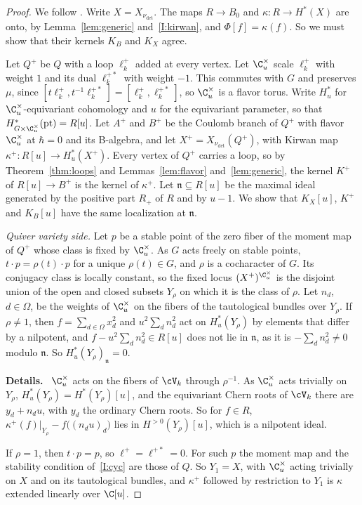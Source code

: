 \documentclass[11pt]{amsart}
\newenvironment{details}{\par\color{black!60!green}\noindent\textbf{Details.}\ }{\par}
\begin{document}
\begin{proof}
We follow .  Write $X=X_{\nu_{\det}}$.  The maps $R\to B_0$
and $\kappa\colon R\to H^*(X)$ are onto, by Lemma~\ref{lem:generic}
and~\ref{I:kirwan}, and $\Phi[f]=\kappa(f)$.  So we must show that their
kernels $K_B$ and $K_X$ agree.

Let $Q^+$ be $Q$ with a loop $\ell_k^+$ added at every vertex.  Let
$\C^\times_u$ scale $\ell_k^+$ with weight $1$ and its dual $\ell_k^{+*}$ with
weight $-1$.  This commutes with $G$ and preserves $\mu$, since
$[t\ell_k^+,t^{-1}\ell_k^{+*}]=[\ell_k^+,\ell_k^{+*}]$, so $\C^\times_u$ is a
flavor torus.  Write $H^*_u$ for $\C^\times_u$-equivariant cohomology and $u$ for
the equivariant parameter, so that $H^*_{G\times\C^\times_u}(\mathrm{pt})=R[u]$.
Let $A^+$ and $B^+$ be the Coulomb branch of $Q^+$ with flavor $\C^\times_u$
at $\hbar=0$ and its B-algebra, and let $X^+=X_{\nu_{\det}}(Q^+)$, with Kirwan
map $\kappa^+\colon R[u]\to H^*_u(X^+)$.  Every vertex of $Q^+$ carries a loop,
so by Theorem~\ref{thm:loops} and Lemmas~\ref{lem:flavor}
and~\ref{lem:generic}, the kernel $K^+$ of $R[u]\to B^+$ is the kernel of
$\kappa^+$.  Let $\mathfrak n\subseteq R[u]$ be the maximal ideal generated by
the positive part $R_+$ of $R$ and by $u-1$.  We show that $K_X[u]$, $K^+$ and
$K_B[u]$ have the same localization at $\mathfrak n$.

\emph{Quiver variety side.}  Let $p$ be a stable point of the zero fiber of
the moment map of $Q^+$ whose class is fixed by $\C^\times_u$.  As $G$ acts
freely on stable points, $t\cdot p=\rho(t)\cdot p$ for a unique $\rho(t)\in G$,
and $\rho$ is a cocharacter of $G$.  Its conjugacy class is locally constant,
so the fixed locus $(X^+)^{\C^\times_u}$ is the disjoint union of the open and
closed subsets $Y_\rho$ on which it is the class of $\rho$.  Let $n_d$,
$d\in\Omega$, be the weights of $\C^\times_u$ on the fibers of the tautological
bundles over $Y_\rho$.  If $\rho\neq1$, then $f=\sum_{d\in\Omega}x_d^2$ and
$u^2\sum_dn_d^2$ act on $H^*_u(Y_\rho)$ by elements that differ by a nilpotent,
and $f-u^2\sum_dn_d^2\in R[u]$ does not lie in $\mathfrak n$, as it is
$-\sum_dn_d^2\neq0$ modulo $\mathfrak n$.  So $H^*_u(Y_\rho)_{\mathfrak n}=0$.
\begin{details}
$\C^\times_u$ acts on the fibers of $\cV_k$ through $\rho^{-1}$.  As
$\C^\times_u$ acts trivially on $Y_\rho$,
$H^*_u(Y_\rho)=H^*(Y_\rho)[u]$, and the equivariant Chern roots of $\cV_k$ there
are $y_d+n_du$, with $y_d$ the ordinary Chern roots.  So for $f\in R$,
$\kappa^+(f)|_{Y_\rho}-f\big((n_du)_d\big)$ lies in $H^{>0}(Y_\rho)[u]$, which is
a nilpotent ideal.
\end{details}
If $\rho=1$, then $t\cdot p=p$, so
$\ell^+=\ell^{+*}=0$.  For such $p$ the moment map and the stability condition
of~\ref{I:cyc} are those of $Q$.  So $Y_1=X$, with $\C^\times_u$ acting
trivially on $X$ and on its tautological bundles, and $\kappa^+$ followed by
restriction to $Y_1$ is $\kappa$ extended linearly over $\C[u]$.


\end{proof}
\end{document}

